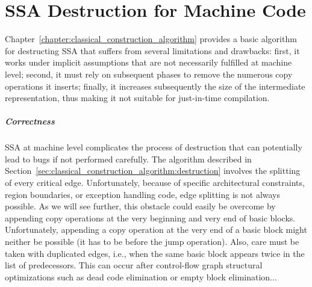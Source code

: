\chapter{SSA Destruction for Machine Code }


\label{chapter:alternative_ssa_destruction_algorithm}


Chapter~\ref{chapter:classical_construction_algorithm} provides a basic algorithm for destructing SSA that suffers from several limitations and drawbacks: 
first, it works under implicit assumptions that are not necessarily fulfilled at machine level; 
second, it must rely on subsequent phases to remove the numerous copy operations it inserts; 
finally, it increases subsequently the size of the intermediate representation, thus making it not suitable for just-in-time compilation.

\paragraph{Correctness}
SSA at machine level complicates the process of destruction that can potentially lead to bugs if not performed carefully. 
The algorithm described in Section~\ref{sec:classical_construction_algorithm:destruction} involves the splitting of every critical edge. 
Unfortunately, because of specific architectural constraints, region boundaries, or exception handling code, edge splitting is not always possible. 
As we will see further, this obstacle could easily be overcome by appending copy operations at the very beginning and very end of basic blocks. 
Unfortunately, appending a copy operation at the very end of a basic block might neither be possible (it has to be before the jump operation). 
Also, care must be taken with duplicated edges, i.e., when the same basic block appears twice in the list of predecessors. 
This can occur after control-flow graph structural optimizations such as dead code elimination or empty block elimination... 

